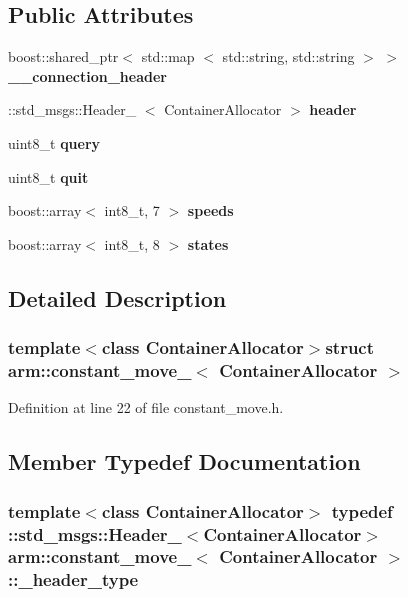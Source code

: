 \subsection*{\-Public \-Attributes}
\begin{DoxyCompactItemize}
\item 
boost\-::shared\-\_\-ptr$<$ std\-::map\*
$<$ std\-::string, std\-::string $>$ $>$ {\bf \-\_\-\-\_\-connection\-\_\-header}
\item 
\-::std\-\_\-msgs\-::\-Header\-\_\-\*
$<$ \-Container\-Allocator $>$ {\bf header}
\item 
uint8\-\_\-t {\bf query}
\item 
uint8\-\_\-t {\bf quit}
\item 
boost\-::array$<$ int8\-\_\-t, 7 $>$ {\bf speeds}
\item 
boost\-::array$<$ int8\-\_\-t, 8 $>$ {\bf states}
\end{DoxyCompactItemize}


\subsection{\-Detailed \-Description}
\subsubsection*{template$<$class \-Container\-Allocator$>$struct arm\-::constant\-\_\-move\-\_\-$<$ Container\-Allocator $>$}



\-Definition at line 22 of file constant\-\_\-move.\-h.



\subsection{\-Member \-Typedef \-Documentation}
\subsubsection[{\-\_\-header\-\_\-type}]{\setlength{\rightskip}{0pt plus 5cm}template$<$class \-Container\-Allocator$>$ typedef \-::std\-\_\-msgs\-::\-Header\-\_\-$<$\-Container\-Allocator$>$ {\bf arm\-::constant\-\_\-move\-\_\-}$<$ \-Container\-Allocator $>$\-::{\bf \-\_\-header\-\_\-type}}\label{structarm_1_1constant__move___ad76fe1091f224876d2415c9fc69493a3}


